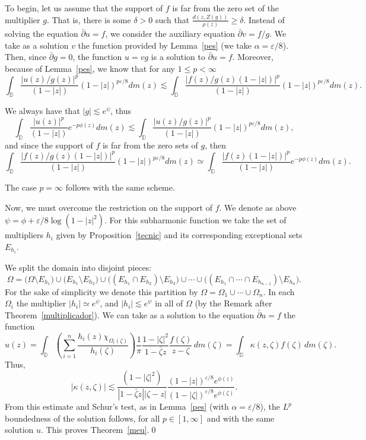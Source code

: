 \documentclass[12pt,twoside,final,psamsfonts]{amsart}
\theoremstyle{plain}
\theoremstyle{remark}
\theoremstyle{definition}
\newcommand{\D}{{\mathbb D}}
\newcommand{\dbar}{\bar\partial}
\begin{document}
To begin, let us assume that the support of $f$ is far from the zero set of the
multiplier $g$. That is, there is some $\delta>0$ such that 
$\frac{d(z,Z(g))}{\rho(z)}\ge\delta$.
Instead of solving the equation $\dbar u =f$, we consider the
auxiliary equation $\dbar v=f/g$. We take as a solution $v$ the function 
provided by Lemma~\ref{pes} (we take $\alpha=\varepsilon/8$). Then,
since $\dbar g=0$, the function $u=v g$ is a solution to $\dbar u =f$.
Moreover, because of Lemma~\ref{pes}, we know that for any $1\le p <\infty$
\[
\int_\D \frac{|u(z)/g(z)|^p}{(1-|z|)}(1-|z|)^{p\varepsilon/8} dm(z)\lesssim
\int_\D \frac{|f(z)/g(z)(1-|z|)|^p}{(1-|z|)}(1-|z|)^{p\varepsilon/8} dm(z).
\]

We always have that $|g|\lesssim e^{\psi}$, thus
\[
\int_\D \frac{|u(z)|^p}{(1-|z|)}e^{-p\phi(z)} dm(z)\lesssim
\int_\D \frac{|u(z)/g(z)|^p}{(1-|z|)}(1-|z|)^{p\varepsilon/8} dm(z),
\]
and since the support of $f$ is far from the zero sets of $g$, then
\[
\int_\D \frac{|f(z)/g(z)(1-|z|)|^p}{(1-|z|)}(1-|z|)^{p\varepsilon/8} dm(z)
\simeq
\int_\D \frac{|f(z)(1-|z|)|^p}{(1-|z|)}e^{-p\phi(z)} dm(z).
\]

The case $p=\infty$ follows with the same scheme.

Now, we must overcome the restriction on the support of $f$. 
We denote as above $\psi=\phi+\varepsilon/8 \log (1-|z|^2)$. For this
subharmonic function we take the set of
multipliers $h_i$ given by Proposition~\ref{tecnic} and its corresponding
exceptional sets $E_{h_i}$.

We split the domain into disjoint pieces: 
\[
\Omega=\bigl(\Omega\setminus E_{h_1}\bigr)\cup 
\bigl(E_{h_1}\setminus E_{h_2}\bigr)\cup
\bigl((E_{h_1}\cap E_{h_2})\setminus E_{h_3}\bigr)\cup\cdots\cup 
\bigl((E_{h_1}\cap\cdots\cap E_{h_{n-1}})\setminus E_{h_n}\bigr).
\] 
For the sake of simplicity we denote this partition 
 by $\Omega=\Omega_1\cup\cdots\cup\Omega_n$. In each $\Omega_i$ the
multiplier $|h_i|\simeq e^{\psi}$, and $|h_i|\lesssim e^\psi$ in all of
$\Omega$ (by the Remark after Theorem~\ref{multiplicador}). We can take as a solution to the equation
$\dbar u=f$ the function
\[
u(z)=\int_\D \left( \sum_{i=1}^n \frac{h_i(z)\chi_{\Omega_i(\zeta)}}{h_i(\zeta)}
\right)\frac 1\pi\frac{1-|\zeta|^2}{1-\bar\zeta
z}\frac{f(\zeta)}{z-\zeta}\, dm(\zeta)=\int_\D \kappa(z,\zeta)f(\zeta)
\, dm(\zeta).
\]
Thus, 
\[
|\kappa(z,\zeta)|\lesssim \frac{(1-|\zeta|^2)}{|1-\bar\zeta
z||\zeta-z|}\frac{(1-|z|)^{\varepsilon/8}e^{\phi(z)}}
{(1-|\zeta|)^{\varepsilon/8}e^{\phi(\zeta)}}.
\]
From this estimate and Schur's test, as in Lemma~\ref{pes} (with
$\alpha=\varepsilon/8$), the $L^p$ boundedness of the solution follows, for all
$p\in[1,\infty]$ and with the same solution $u$. This proves
Theorem~\ref{meu}.\qed
\end{document}
